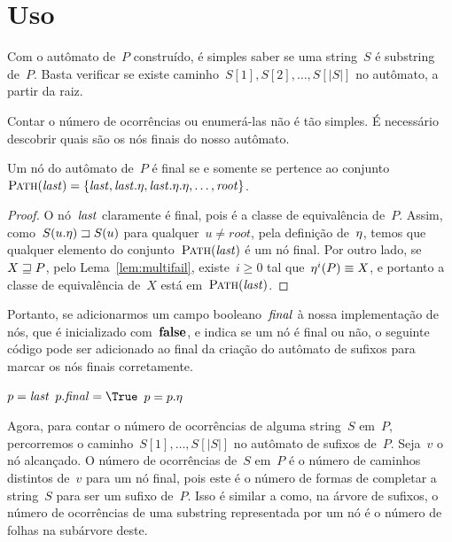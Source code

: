 \section{Uso}

Com o autômato de~$P$ construído, é simples saber se uma string~$S$ é substring de~$P$. Basta verificar se existe caminho~${S[1], S[2], \ldots, S[|S|]}$ no autômato, a partir da raiz.

Contar o número de ocorrências ou enumerá-las não é tão simples. É necessário descobrir quais são os nós finais do nosso autômato.

\begin{prop}
Um nó do autômato de~$P$ é final se e somente se pertence ao conjunto~$\textsc{Path}(\mathit{last}) = \{\mathit{last}, \mathit{last}.\eta, \mathit{last}.\eta.\eta, \ldots, \mathit{root}\}$.
\end{prop}

\begin{proof}
O nó~$\mathit{last}$ claramente é final, pois é a classe de equivalência de~$P$. Assim, como~${S(u.\eta) \sqsupset S(u)}$ para qualquer~${u \neq root}$, pela definição de~$\eta$, temos que qualquer elemento do conjunto~$\textsc{Path}(\mathit{last})$ é um nó final. Por outro lado, se~${X \sqsupseteq P}$, pelo Lema~\ref{lem:multifail}, existe~${i \geq 0}$ tal que~${\eta^i(P) \equiv X}$, e portanto a classe de equivalência de~$X$ está em~$\textsc{Path}(\mathit{last})$.
\end{proof}

Portanto, se adicionarmos um campo booleano~$\mathit{final}$ à nossa implementação de nós, que é inicializado com~$\textbf{false}$, e indica se um nó é final ou não, o seguinte código pode ser adicionado ao final da criação do autômato de sufixos para marcar os nós finais corretamente.

\begin{algorithm}
\begin{algorithmic}[1]
\State $p = \mathit{last}$
    \State $p.\final = \True$
    \State $p = p.\eta$
\EndWhile
\end{algorithmic}
\end{algorithm}

Agora, para contar o número de ocorrências de alguma string~$S$ em~$P$, percorremos o caminho~${S[1], \ldots, S[|S|]}$ no autômato de sufixos de~$P$. Seja~$v$ o nó alcançado. O número de ocorrências de~$S$ em~$P$ é o número de caminhos distintos de~$v$ para um nó final, pois este é o número de formas de completar a string~$S$ para ser um sufixo de~$P$. Isso é similar a como, na árvore de sufixos, o número de ocorrências de uma substring representada por um nó é o número de folhas na subárvore deste.


